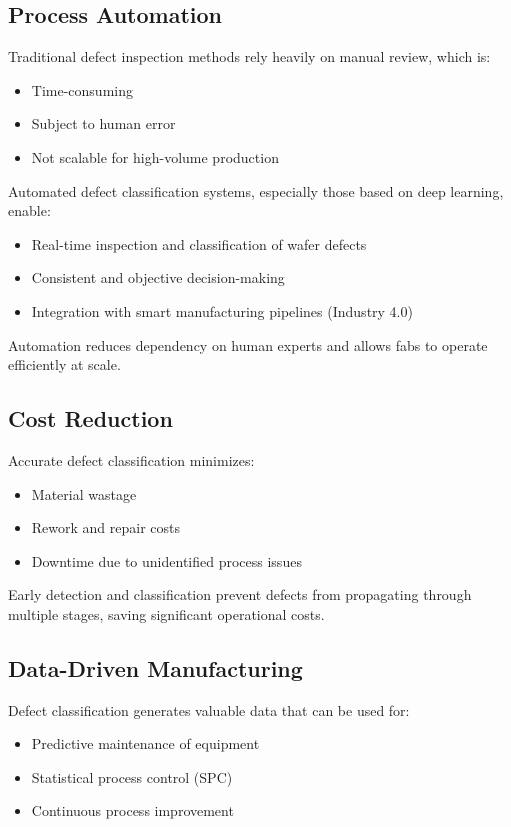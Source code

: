 \subsection {Process Automation}

Traditional defect inspection methods rely heavily on manual review, which is:
\begin{itemize}
\item Time-consuming
\item Subject to human error
\item Not scalable for high-volume production
\end{itemize} 

Automated defect classification systems, especially those based on deep learning, enable:
\begin{itemize}
\item Real-time inspection and classification of wafer defects
\item Consistent and objective decision-making
\item Integration with smart manufacturing pipelines (Industry 4.0)
\end{itemize} 
Automation reduces dependency on human experts and allows fabs to operate efficiently at scale.

\subsection {Cost Reduction}

Accurate defect classification minimizes:
\begin{itemize}
\item Material wastage
\item Rework and repair costs
\item Downtime due to unidentified process issues
\end{itemize}
Early detection and classification prevent defects from propagating through multiple stages, saving significant operational costs.

\subsection {Data-Driven Manufacturing}

Defect classification generates valuable data that can be used for:
\begin{itemize}
\item Predictive maintenance of equipment
\item Statistical process control (SPC)
\item Continuous process improvement
\end{itemize} 

